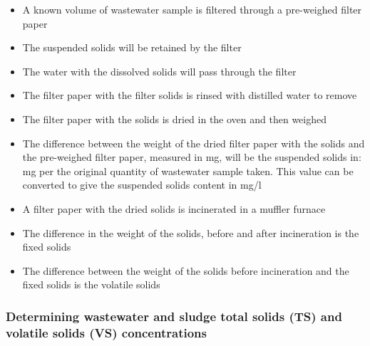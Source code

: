 				\begin{itemize}
					\item A known volume of wastewater sample is filtered through a pre-weighed filter paper
					\item The suspended solids will be retained by the filter
					\item The water with the dissolved solids will pass through the filter
					\item The filter paper with the filter solids is rinsed with distilled water to remove 
					\item The filter paper with the solids is dried in the oven and then weighed
					\item The difference between the weight of the dried filter paper with the solids and the pre-weighed filter paper, measured in mg, will be the suspended solids in: mg per the original quantity of wastewater sample taken.  This value can be converted to give the suspended solids content in mg/l
					\item A filter paper with the dried solids is incinerated in a muffler furnace
					\item The difference in the weight of the solids, before and after incineration is the fixed solids
					\item The difference between the weight of the solids before incineration and the fixed solids is the volatile solids
				\end{itemize}
				
	\subsubsection{Determining wastewater and sludge total solids (TS) and volatile solids (VS) concentrations}				
				
